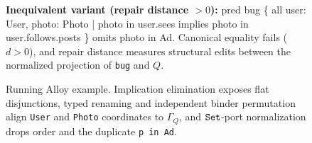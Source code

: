 \begin{figure}[t]
\vspace{2pt}


\vspace{3pt}

\begin{minipage}{0.95\linewidth}
\textbf{Inequivalent variant (repair distance $>0$):}\quad
{\ttfamily pred bug \{ all user: User, photo: Photo | photo in user.sees implies photo in user.follows.posts \}}
omits {\ttfamily photo in Ad}. Canonical equality fails ($d>0$), and repair
distance measures structural edits between the normalized projection of
\texttt{bug} and $Q$.
\end{minipage}

\caption{Running Alloy example. Implication elimination exposes flat
disjunctions, typed renaming and independent binder permutation align
\texttt{User} and \texttt{Photo} coordinates to $\Gamma_Q$, and
$\texttt{Set}$-port normalization drops order and the duplicate \texttt{p in Ad}.}
\label{fig:alloy-certificate-example}
\end{figure}
